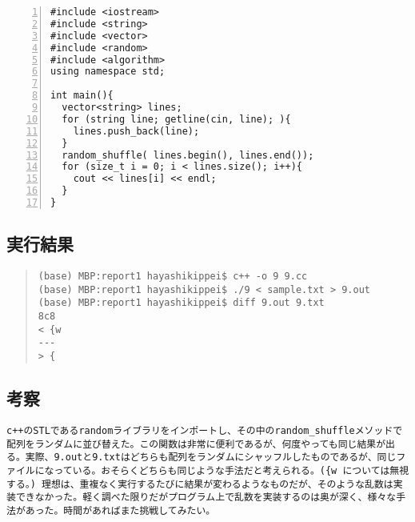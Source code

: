 \documentclass[11pt,a4paper]{jsarticle}
\begin{document}
\begin{lstlisting}[numbers=left,numberstyle=\ttfamily,xleftmargin=2zw]
#include <iostream>
#include <string>
#include <vector>
#include <random>
#include <algorithm>
using namespace std;

int main(){
  vector<string> lines;
  for (string line; getline(cin, line); ){
    lines.push_back(line);
  }
  random_shuffle( lines.begin(), lines.end());
  for (size_t i = 0; i < lines.size(); i++){
    cout << lines[i] << endl;
  }
}

\end{lstlisting}
%
\subsection{実行結果}
\begin{quote}           %
\begin{verbatim}
(base) MBP:report1 hayashikippei$ c++ -o 9 9.cc
(base) MBP:report1 hayashikippei$ ./9 < sample.txt > 9.out
(base) MBP:report1 hayashikippei$ diff 9.out 9.txt
8c8
< {w
---
> {

\end{verbatim}
\end{quote}
%
\subsection{考察}
\begin{verbatim}
c++のSTLであるrandomライブラリをインポートし、その中のrandom_shuffleメソッドで配列をランダムに並び替えた。この関数は非常に便利であるが、何度やっても同じ結果が出る。実際、9.outと9.txtはどちらも配列をランダムにシャッフルしたものであるが、同じファイルになっている。おそらくどちらも同じような手法だと考えられる。({w については無視する。) 理想は、重複なく実行するたびに結果が変わるようなものだが、そのような乱数は実装できなかった。軽く調べた限りだがプログラム上で乱数を実装するのは奥が深く、様々な手法があった。時間があればまた挑戦してみたい。
\end{verbatim}
%
\end{document}
